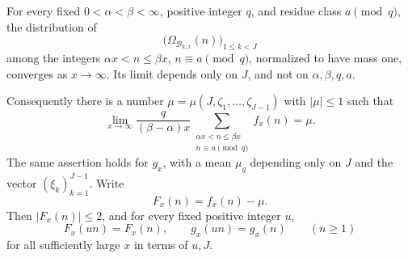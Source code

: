 \begin{lemma}\label{lem:labels-marginal}
For every fixed $0<\alpha<\beta<\infty$, positive integer $q$, and residue
class $a\pmod q$, the distribution of
\[
 \bigl(\Omega_{\mathcal B_{k,x}}(n)\bigr)_{1\leq k<J}
\]
among the integers $\alpha x<n\leq\beta x$, $n\equiv a\pmod q$,
normalized to have mass one, converges as $x\to\infty$.  Its limit depends
only on $J$, and not on $\alpha,\beta,q,a$.

Consequently there is a number $\mu=\mu(J,\zeta_1,\ldots,\zeta_{J-1})$
with $|\mu|\leq1$ such that
\begin{equation}\label{eq:labels-marginal-mean}
 \lim_{x\to\infty}
 \frac{q}{(\beta-\alpha)x}
 \sum_{\substack{\alpha x<n\leq\beta x\\n\equiv a\pmod q}}f_x(n)
 =\mu.
\end{equation}
The same assertion holds for $g_x$, with a mean $\mu_g$ depending only
on $J$ and the vector $(\xi_k)_{k=1}^{J-1}$.
Write
\begin{equation}\label{eq:labels-centered}
 F_x(n)=f_x(n)-\mu.
\end{equation}
Then $|F_x(n)|\leq2$, and for every fixed positive integer $u$,
\begin{equation}\label{eq:labels-multiplier}
 F_x(un)=F_x(n),\qquad g_x(un)=g_x(n)\qquad(n\geq1)
\end{equation}
for all sufficiently large $x$ in terms of $u,J$.
\end{lemma}

